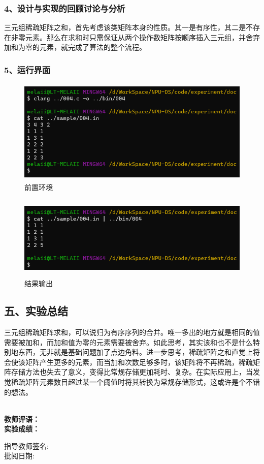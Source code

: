 \documentclass[UTF8, a4paper]{ctexart}
\begin{document}
\subsubsection*{4、设计与实现的回顾讨论与分析}
三元组稀疏矩阵之和，首先考虑该类矩阵本身的性质。其一是有序性，其二是不存在非零元素。那么在求和时只需保证从两个操作数矩阵按顺序插入三元组，并舍弃加和为零的元素，就完成了算法的整个流程。
\subsubsection*{5、运行界面}
\begin{figure}[H]
	\begin{minipage}[t]{\linewidth}
		\centering
		\includegraphics[width=125mm,height=50mm]{./assets/DS04-2}
		\caption{前置环境}
	\end{minipage}
\end{figure}
\begin{figure}[H]
	\begin{minipage}[t]{\linewidth}
		\centering
		\includegraphics[width=125mm,height=40mm]{./assets/DS04-3}
		\caption{结果输出}
	\end{minipage}
\end{figure}

\subsection*{五、实验总结}
三元组稀疏矩阵求和，可以说归为有序序列的合并。唯一多出的地方就是相同的值需要被加和，而加和值为零的元素需要被舍弃。如此思考，其实该和也不是什么特别地东西，无非就是基础问题加了点边角料。进一步思考，稀疏矩阵之和直觉上将会使该矩阵产生更多的元素，而当加和次数足够多时，该矩阵将不再稀疏，稀疏矩阵存储方法也失去了意义，变得比常规存储更加耗时、复杂。在实际应用上，当发觉稀疏矩阵元素数目超过某一个阈值时将其转换为常规存储形式，这或许是个不错的想法。

~\\
\textbf{教师评语：}
~\\
\textbf{实验成绩：}

\begin{flushright}
\mbox{指导教师签名:\qquad\qquad} \\
\mbox{批阅日期:\qquad\qquad}
\end{flushright}
\end{document}
